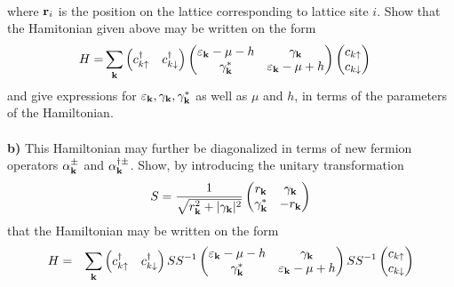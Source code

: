 \begin{problem}
\begin{eqnarray}
\end{eqnarray}
where ${\bf r}_i$ is the position on the lattice corresponding to lattice site $i$. Show that the Hamitonian given above may be written on the form
\begin{align}
	\begin{split}
		H =&   \sum_{{\bf k}} 
		\begin{pmatrix} c_{k\uparrow}^\dagger & c_{k \downarrow}^\dagger  \end{pmatrix}
		\begin{pmatrix} \varepsilon_{{\bf k}}-\mu - h & \gamma_{{\bf k}} \\ \gamma_{{\bf k}}^{*} & \varepsilon_{{\bf k}} - \mu + h \end{pmatrix}  
		\begin{pmatrix} c_{k \uparrow} \\ c_{ k\downarrow}  \end{pmatrix}
	\end{split} \nonumber 
\end{align}
and give expressions for $\varepsilon_{{\bf k}}, \gamma_{{\bf k}}, \gamma_{{\bf k}}^{*}$ as well as $\mu$ and $h$, in terms of the parameters of the Hamiltonian.  
\ \\
\ \\
{\bf b)} This Hamiltonian may further be diagonalized in terms of new fermion operators $\alpha^{\pm}_{{\bf k}}$ and $\alpha^{\dagger \pm}_{{\bf k}}$. Show, by introducing the unitary transformation
\begin{eqnarray}
	S = \frac{1}{\sqrt{r_{{\bf k}}^2  + | \gamma_{{\bf k}} |^2}}\begin{pmatrix} r_{{\bf k}} & \gamma_{{\bf k}} \\ \gamma_{{\bf k}}^{*} & -r_{{\bf k}} \end{pmatrix}  \nonumber 
\end{eqnarray}
that the Hamiltonian may be written on the form
\begin{eqnarray}
	H & =&   \sum_{{\bf k}} 
	\begin{pmatrix} c_{k\uparrow}^\dagger & c_{k \downarrow}^\dagger  \end{pmatrix} S S^{-1}
	\begin{pmatrix} \varepsilon_{{\bf k}}-\mu - h & \gamma_{{\bf k}} \\ \gamma_{{\bf k}}^{*} & \varepsilon_{{\bf k}} - \mu + h \end{pmatrix}   S S^{-1}
	\begin{pmatrix} c_{k \uparrow} \\ c_{ k\downarrow}  \end{pmatrix} \nonumber \\

\end{eqnarray}
\end{problem}
